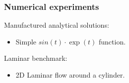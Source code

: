 \begin{frame}[t]
\frametitle{Numerical experiments}
\vfill
Manufactured analytical solutions:
\begin{itemize}
\item Simple $ sin(t)\cdot\exp(t) $ function.
\end{itemize}
\vspace{1cm}
Laminar benchmark:
\begin{itemize}
\item 2D Laminar flow around a cylinder.
\end{itemize}
\vfill
\end{frame}